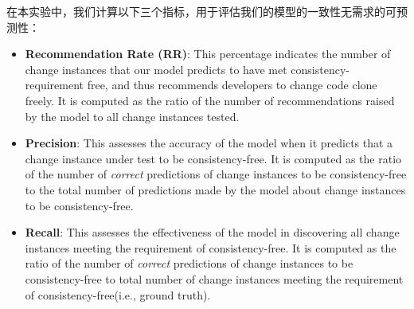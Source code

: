 在本实验中，我们计算以下三个指标，用于评估我们的模型的一致性无需求的可预测性：
\begin{itemize}
\item \textbf{Recommendation Rate (RR)}: 
This percentage indicates the number of change instances that our model predicts to have met consistency-requirement free, and thus recommends developers to change code clone freely.
It is computed as the ratio of the number of recommendations raised by the model to all change instances tested.
\item \textbf{Precision}: 
This assesses the accuracy of the model when it predicts that a change instance under test to be consistency-free. It is computed as the ratio of the number of {\em correct} predictions of change instances to be consistency-free to the total number of predictions made by the model about change instances to be consistency-free.
\item \textbf{Recall}: 
This assesses the effectiveness of the model in discovering all change instances meeting the requirement of consistency-free.
It is computed as the ratio of the number of {\em correct} predictions of change instances to be consistency-free to total number of change instances meeting the requirement of consistency-free(i.e., ground truth).
\end{itemize}


